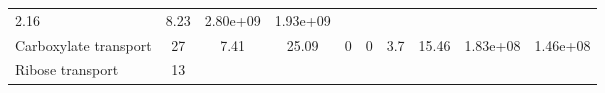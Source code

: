 \documentclass[]{article}
\begin{document}
\begin{longtable}[]{@{}lccccccccc@{}}
\begin{minipage}[t]{0.08\columnwidth}
2.16\strut
\end{minipage} & \begin{minipage}[t]{0.08\columnwidth}\centering\strut
8.23\strut
\end{minipage} & \begin{minipage}[t]{0.08\columnwidth}\centering\strut
2.80e+09\strut
\end{minipage} & \begin{minipage}[t]{0.08\columnwidth}\centering\strut
1.93e+09\strut
\end{minipage}\tabularnewline
\begin{minipage}[t]{0.07\columnwidth}\raggedright\strut
Carboxylate transport\strut
\end{minipage} & \begin{minipage}[t]{0.06\columnwidth}\centering\strut
27\strut
\end{minipage} & \begin{minipage}[t]{0.08\columnwidth}\centering\strut
7.41\strut
\end{minipage} & \begin{minipage}[t]{0.08\columnwidth}\centering\strut
25.09\strut
\end{minipage} & \begin{minipage}[t]{0.08\columnwidth}\centering\strut
0\strut
\end{minipage} & \begin{minipage}[t]{0.08\columnwidth}\centering\strut
0\strut
\end{minipage} & \begin{minipage}[t]{0.08\columnwidth}\centering\strut
3.7\strut
\end{minipage} & \begin{minipage}[t]{0.08\columnwidth}\centering\strut
15.46\strut
\end{minipage} & \begin{minipage}[t]{0.08\columnwidth}\centering\strut
1.83e+08\strut
\end{minipage} & \begin{minipage}[t]{0.08\columnwidth}\centering\strut
1.46e+08\strut
\end{minipage}\tabularnewline
\begin{minipage}[t]{0.07\columnwidth}\raggedright\strut
Ribose transport\strut
\end{minipage} & \begin{minipage}[t]{0.06\columnwidth}\centering\strut
13\strut
\end{minipage} & \begin{minipage}[t]{0.08\columnwidth}\centering\strut

\end{minipage}
\end{longtable}
\end{document}
